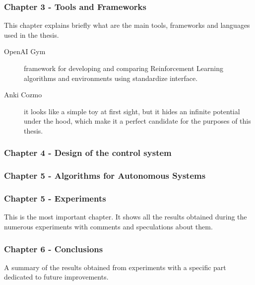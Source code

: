 \subsubsection*{Chapter 3 - Tools and Frameworks} 
This chapter explains briefly what are the main tools, frameworks and languages used in the thesis.
\begin{description}
	\item[OpenAI Gym] framework for developing and comparing Reinforcement Learning algorithms and environments using standardize interface.
	\item [Anki Cozmo] it looks like a simple toy at first sight, but it hides an infinite potential under the hood, which make it a perfect candidate for the purposes of this thesis.
\end{description}

\subsubsection*{Chapter 4 - Design of the control system}

\subsubsection*{Chapter 5 - Algorithms for Autonomous Systems} 


\subsubsection*{Chapter 5 - Experiments} 
This is the most important chapter. It shows all the results obtained during the numerous experiments with comments and speculations about them.

\subsubsection*{Chapter 6 - Conclusions} 
A summary of the results obtained from experiments with a specific part dedicated to future improvements.